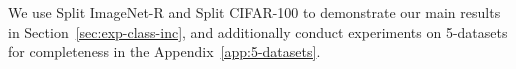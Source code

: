 \documentclass[runningheads]{llncs}
\newcommand{\sayna}[1]{\textcolor{blue}{Sayna: #1}}
\newcommand{\zifeng}[1]{\textcolor{red}{Zifeng: #1}}
\begin{document}
We use Split ImageNet-R and Split CIFAR-100 to demonstrate our main results in Section~\ref{sec:exp-class-inc}, and additionally conduct experiments on 5-datasets for completeness in the Appendix~\ref{app:5-datasets}. 

\end{document}
